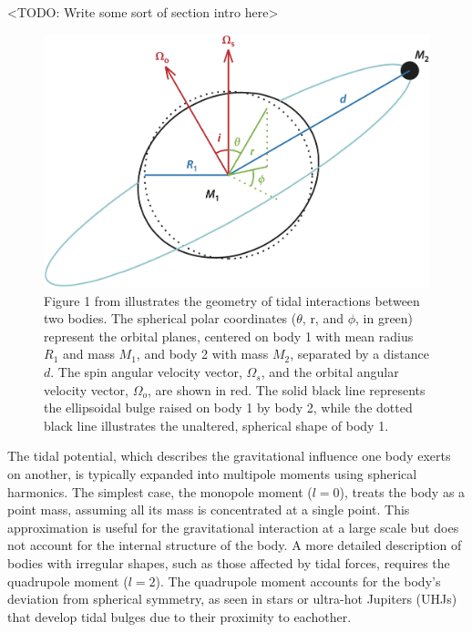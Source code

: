 \documentclass[oneside,12pt]{amsart}
\numberwithin{page}{section}
\begin{document}
<TODO: Write some sort of section intro here>



\begin{figure}[htbp]
    \centering
    \includegraphics[width=\linewidth]{figs/ogilvie_fig1.png}
    \caption{Figure 1 from \citet{ogilvie2014tidal} illustrates the geometry of tidal interactions between two bodies. The spherical polar coordinates ($\theta$, r, and $\phi$, in green) represent the orbital planes, centered on body 1 with mean radius $R_1$ and mass $M_1$, and body 2 with mass $M_2$, separated by a distance $d$. The spin angular velocity vector, $\Omega_s$, and the orbital angular velocity vector, $\Omega_o$, are shown in red. The solid black line represents the ellipsoidal bulge raised on body 1 by body 2, while the dotted black line illustrates the unaltered, spherical shape of body 1.}
    \label{fig:ogilvie-fig1}
\end{figure}

The tidal potential, which describes the gravitational influence one body exerts on another, is typically expanded into multipole moments using spherical harmonics. The simplest case, the monopole moment ($l = 0$), treats the body as a point mass, assuming all its mass is concentrated at a single point. This approximation is useful for the gravitational interaction at a large scale but does not account for the internal structure of the body. A more detailed description of bodies with irregular shapes, such as those affected by tidal forces, requires the quadrupole moment ($l = 2$). The quadrupole moment accounts for the body's deviation from spherical symmetry, as seen in stars or ultra-hot Jupiters (UHJs) that develop tidal bulges due to their proximity to eachother.
\end{document}

